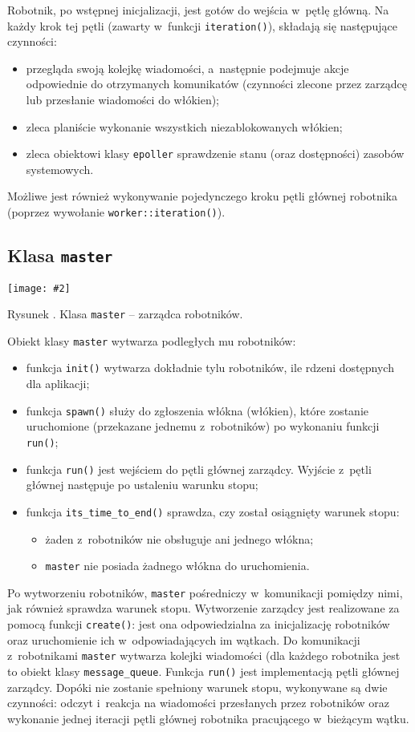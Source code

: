 \documentclass[12pt]{mwart}
\newcommand{\code}{\texttt}
\newcommand{\dcolon}{::}
\newcommand{\procbr}{()}
\newcommand{\function}[1]{\code{#1\procbr}}
\newcounter{figmain}
\newcommand{\myownfigure}[4]{ \newcounter{#1} \setcounter{#1}{\value{figmain}} \addtocounter{figmain}{1} \begin{center} \label{fig:#1} \centering \texttt{[image: \#2]}\\ \nopagebreak[5] \parbox[t]{11.5cm}{Rysunek \arabic{#1}. #3.} \end{center}}
\begin{document}
\par
\indent
  Robotnik, po wstępnej inicjalizacji, jest gotów do wejścia w~pętlę główną. Na każdy krok tej pętli (zawarty w~funkcji \function{iteration}), składają się następujące czynności:
  \begin{itemize}
    \item przegląda swoją kolejkę wiadomości, a~następnie podejmuje akcje odpowiednie do otrzymanych komunikatów (czynności zlecone przez zarządcę 
      lub przesłanie wiadomości do włókien);
    \item zleca planiście wykonanie wszystkich niezablokowanych włókien;
    \item zleca obiektowi klasy \code{epoller} sprawdzenie stanu (oraz dostępności) zasobów systemowych.
  \end{itemize}
  Możliwe jest również wykonywanie pojedynczego kroku pętli głównej robotnika (poprzez wywołanie \function{worker\dcolon iteration}).
\par
%
\newpage
\subsection{Klasa \code{master}}
    \myownfigure{Master}{Master.png}{Klasa \code{master} -- zarządca robotników}{.7}
%
\indent
  Obiekt klasy \code{master} wytwarza podległych mu robotników:  
  \begin{itemize}
    \item funkcja \code{init()} wytwarza dokładnie tylu robotników, ile rdzeni dostępnych dla aplikacji;
    \item funkcja \code{spawn()} służy do zgłoszenia włókna (włókien), które zostanie uruchomione (przekazane jednemu z~robotników) po wykonaniu funkcji \code{run()};
    \item funkcja \code{run()} jest wejściem do pętli głównej zarządcy. Wyjście z~pętli głównej następuje po ustaleniu warunku stopu;
    \item funkcja \code{its\_time\_to\_end()} sprawdza, czy został osiągnięty warunek stopu:
      \begin{itemize}
        \item żaden z~robotników nie obsługuje ani jednego włókna;
        \item \code{master} nie posiada żadnego włókna do uruchomienia.
      \end{itemize}
  \end{itemize}
\par
\indent
  Po wytworzeniu robotników, \code{master} pośredniczy w~komunikacji pomiędzy nimi, jak również sprawdza warunek stopu.
  Wytworzenie zarządcy jest realizowane za pomocą funkcji \code{create()}: 
  jest ona odpowiedzialna za inicjalizację robotników oraz uruchomienie ich w~odpowiadających im wątkach.
  Do komunikacji z~robotnikami \code{master} wytwarza kolejki wiadomości (dla każdego robotnika jest to obiekt klasy \code{message\_queue}.
  Funkcja \code{run\procbr} jest implementacją pętli głównej zarządcy. Dopóki nie zostanie spełniony warunek stopu,
  wykonywane są dwie czynności: odczyt i~reakcja na wiadomości przesłanych przez robotników oraz wykonanie jednej iteracji pętli głównej
  robotnika pracującego w~bieżącym wątku.
\par
\newpage
\end{document}
